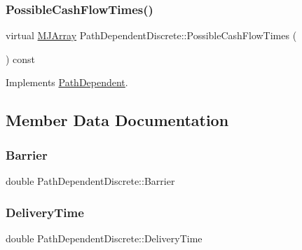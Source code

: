 \subsubsection{\texorpdfstring{Possible\+Cash\+Flow\+Times()}{PossibleCashFlowTimes()}}
{\footnotesize\ttfamily virtual \hyperlink{classMJArray}{M\+J\+Array} Path\+Dependent\+Discrete\+::\+Possible\+Cash\+Flow\+Times (\begin{DoxyParamCaption}{ }\end{DoxyParamCaption}) const\hspace{0.3cm}{\ttfamily [virtual]}}



Implements \hyperlink{classPathDependent_a4c8bf82be7f4443c5c8177d7500d542d}{Path\+Dependent}.



\subsection{Member Data Documentation}
\hypertarget{classPathDependentDiscrete_ae82fb16f2f850433be138080dea98435}{}\label{classPathDependentDiscrete_ae82fb16f2f850433be138080dea98435} 
\subsubsection{\texorpdfstring{Barrier}{Barrier}}
{\footnotesize\ttfamily double Path\+Dependent\+Discrete\+::\+Barrier\hspace{0.3cm}{\ttfamily [protected]}}

\hypertarget{classPathDependentDiscrete_a2f46a274471efeff2affc3f893c8e157}{}\label{classPathDependentDiscrete_a2f46a274471efeff2affc3f893c8e157} 
\subsubsection{\texorpdfstring{Delivery\+Time}{DeliveryTime}}
{\footnotesize\ttfamily double Path\+Dependent\+Discrete\+::\+Delivery\+Time\hspace{0.3cm}{\ttfamily [protected]}}

\hypertarget{classPathDependentDiscrete_a276c3260066ef1816e2321ac9aa41ff5}{}\label{classPathDependentDiscrete_a276c3260066ef1816e2321ac9aa41ff5} 
